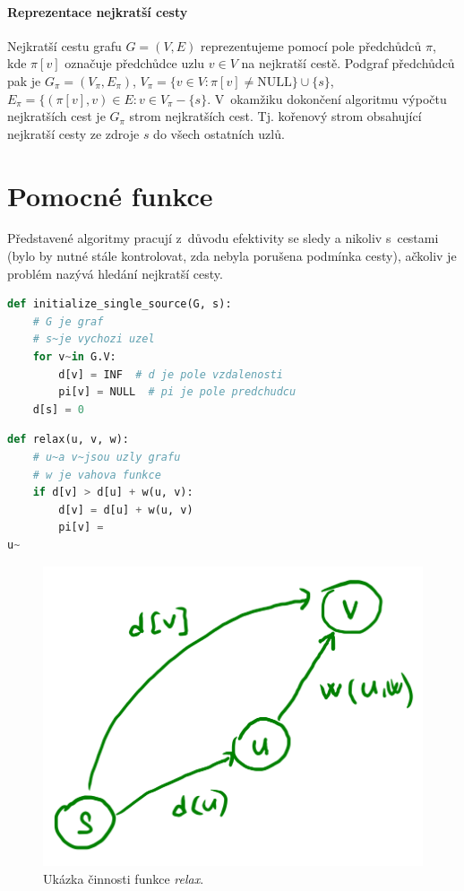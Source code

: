 \paragraph*{Reprezentace nejkratší cesty} Nejkratší cestu grafu $G = (V, E)$ reprezentujeme pomocí pole předchůdců $\pi$, kde $\pi[v]$ označuje předchůdce uzlu $v \in V$ na nejkratší cestě. Podgraf předchůdců pak je $G_{\pi} = (V_{\pi}, E_{\pi})$, $V_{\pi} = \{ v \in V : \pi[v] \neq \text{NULL} \} \cup \{ s \}$, $E_{\pi} = \{ (\pi[v], v) \in E : v \in V_{\pi} - \{ s \}$. V~okamžiku dokončení algoritmu výpočtu nejkratších cest je $G_{\pi}$ strom nejkratších cest. Tj. kořenový strom obsahující nejkratší cesty ze zdroje $s$ do všech ostatních uzlů.


\section{Pomocné funkce}

Představené algoritmy pracují z~důvodu efektivity se sledy a nikoliv s~cestami (bylo by nutné stále kontrolovat, zda nebyla porušena podmínka cesty), ačkoliv je problém nazývá hledání nejkratší cesty.

\bigskip\noindent\begin{minipage}{\linewidth}
\begin{lstlisting}[language=Python, caption={Pomocná inicializační funkce. Složitost je $\Theta(n)$, kde $n$ je počet uzlů.}]
def initialize_single_source(G, s):
    # G je graf
    # s~je vychozi uzel
    for v~in G.V:
        d[v] = INF  # d je pole vzdalenosti
        pi[v] = NULL  # pi je pole predchudcu
    d[s] = 0
\end{lstlisting}
\end{minipage}

\noindent\begin{minipage}{\linewidth}
\begin{lstlisting}[language=Python, caption={Pomocná funkce \textit{relax}. Složitost je $O(1)$.}]
def relax(u, v, w):
    # u~a v~jsou uzly grafu
    # w je vahova funkce
    if d[v] > d[u] + w(u, v):
        d[v] = d[u] + w(u, v)
        pi[v] =
u~\end{lstlisting}
\end{minipage}

\begin{figure}[H]
    \centering
    \includegraphics[width=0.4\linewidth]{relax.png}
    \caption{Ukázka činnosti funkce \textit{relax}.}
\end{figure}


